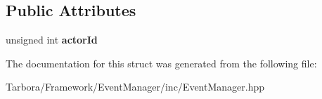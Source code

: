 \subsection*{Public Attributes}
\begin{DoxyCompactItemize}
\item 
\mbox{\label{structTarbora_1_1StopEvent_a21f355bcca197855d30f45a8e0631636}} 
unsigned int {\bfseries actor\+Id}
\end{DoxyCompactItemize}


The documentation for this struct was generated from the following file\+:\begin{DoxyCompactItemize}
\item 
Tarbora/\+Framework/\+Event\+Manager/inc/Event\+Manager.\+hpp\end{DoxyCompactItemize}
